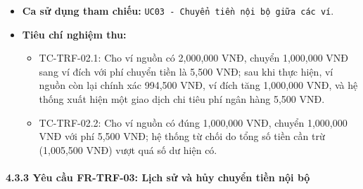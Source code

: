 \documentclass[11pt,a4paper]{article}
\providecommand{\tightlist}{
  \setlength{\itemsep}{0pt}\setlength{\parskip}{0pt}}
\begin{document}
\begin{itemize}
  \begin{itemize}
  \tightlist
  \item
    Bản ghi chuyển tiền nội bộ và bản ghi giao dịch chi tiêu phí liên
    kết.
  \item
    Số dư ví nguồn giảm \(amount + fee\), số dư ví đích tăng \(amount\).
  \item
    Thông báo hoàn thành chuyển tiền kèm thông tin chi tiết về khoản phí
    đã trừ.
  \end{itemize}
\item
  \textbf{Ca sử dụng tham chiếu:}
  \texttt{UC03\ -\ Chuyển\ tiền\ nội\ bộ\ giữa\ các\ ví}.
\item
  \textbf{Tiêu chí nghiệm thu:}

  \begin{itemize}
  \tightlist
  \item
    TC-TRF-02.1: Cho ví nguồn có 2,000,000 VNĐ, chuyển 1,000,000 VNĐ
    sang ví đích với phí chuyển tiền là 5,500 VNĐ; sau khi thực hiện, ví
    nguồn còn lại chính xác 994,500 VNĐ, ví đích tăng 1,000,000 VNĐ, và
    hệ thống xuất hiện một giao dịch chi tiêu phí ngân hàng 5,500 VNĐ.
  \item
    TC-TRF-02.2: Cho ví nguồn có đúng 1,000,000 VNĐ, chuyển 1,000,000
    VNĐ với phí 5,500 VNĐ; hệ thống từ chối do tổng số tiền cần trừ
    (1,005,500 VNĐ) vượt quá số dư hiện có.
  \end{itemize}
\end{itemize}

\newpage

\paragraph{4.3.3 Yêu cầu FR-TRF-03: Lịch sử và hủy chuyển tiền nội
bộ}\label{433-yuxeau-cux1ea7u-fr-trf-03-lux1ecbch-sux1eed-vuxe0-hux1ee7y-chuyux1ec3n-tiux1ec1n-nux1ed9i-bux1ed9}
\end{document}
